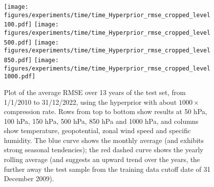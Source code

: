 \begin{figure}[tbp]
    \centering
    \texttt{[image: figures/experiments/time/time\_Hyperprior\_rmse\_cropped\_level100.pdf]}
    \texttt{[image: figures/experiments/time/time\_Hyperprior\_rmse\_cropped\_level500.pdf]}
    \texttt{[image: figures/experiments/time/time\_Hyperprior\_rmse\_cropped\_level850.pdf]}
    \texttt{[image: figures/experiments/time/time\_Hyperprior\_rmse\_cropped\_level1000.pdf]}
    \hfill
    \caption{Plot of the average RMSE over 13 years of the test set, from 1/1/2010 to 31/12/2022, using the hyperprior with about $1000\times$ compression rate. Rows from top to bottom show results at 50 hPa, 100 hPa, 150 hPa, 500 hPa, 850 hPa and 1000 hPa, and columns show temperature, geopotential, zonal wind speed and specific humidity. The blue curve shows the monthly average (and exhibits strong seasonal tendencies); the red dashed curve shows the yearly rolling average (and suggests an upward trend over the years, the further away the test sample from the training data cutoff date of 31 December 2009).}
    \label{fig:generalisation-time}
\end{figure}
